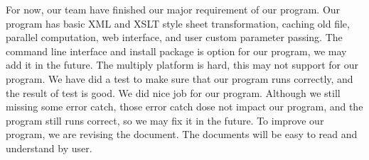 For now, our team have finished our major requirement of our program. 
Our program has basic XML and XSLT style sheet transformation, caching old file, parallel computation, web interface, and user custom parameter passing. 
The command line interface and install package is option for our program, we may add it in the future.
The multiply platform is hard, this may not support for our program.
We have did a test to make sure that our program runs correctly, and the result of test is good.
We did nice job for our program.
Although we still missing some error catch, those error catch dose not impact our program, and the program still runs correct, so we may fix it in the future.
To improve our program, we are revising the document.
The documents will be easy to read and understand by user.

